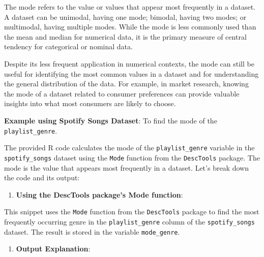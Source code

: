 \documentclass[
]{book}
\newenvironment{Shaded}{\begin{snugshade}}{\end{snugshade}}
\newcommand{\FunctionTok}[1]{\textcolor[rgb]{0.13,0.29,0.53}{\textbf{#1}}}
\newcommand{\NormalTok}[1]{#1}
\newcommand{\OtherTok}[1]{\textcolor[rgb]{0.56,0.35,0.01}{#1}}
\newcommand{\SpecialCharTok}[1]{\textcolor[rgb]{0.81,0.36,0.00}{\textbf{#1}}}
\providecommand{\tightlist}{%
  \setlength{\itemsep}{0pt}\setlength{\parskip}{0pt}}
\begin{document}
The mode refers to the value or values that appear most frequently in a dataset. A dataset can be unimodal, having one mode; bimodal, having two modes; or multimodal, having multiple modes. While the mode is less commonly used than the mean and median for numerical data, it is the primary measure of central tendency for categorical or nominal data.

Despite its less frequent application in numerical contexts, the mode can still be useful for identifying the most common values in a dataset and for understanding the general distribution of the data. For example, in market research, knowing the mode of a dataset related to consumer preferences can provide valuable insights into what most consumers are likely to choose.

\textbf{Example using Spotify Songs Dataset}: To find the mode of the \texttt{playlist\_genre}.

The provided R code calculates the mode of the \texttt{playlist\_genre} variable in the \texttt{spotify\_songs} dataset using the \texttt{Mode} function from the \texttt{DescTools} package. The mode is the value that appears most frequently in a dataset. Let's break down the code and its output:

\begin{enumerate}
\def\labelenumi{\arabic{enumi}.}
\tightlist
\item
  \textbf{Using the DescTools package's Mode function}:
\end{enumerate}

\begin{Shaded}
\end{Shaded}

This snippet uses the \texttt{Mode} function from the \texttt{DescTools} package to find the most frequently occurring genre in the \texttt{playlist\_genre} column of the \texttt{spotify\_songs} dataset. The result is stored in the variable \texttt{mode\_genre}.

\begin{enumerate}
\def\labelenumi{\arabic{enumi}.}
\setcounter{enumi}{1}
\tightlist
\item
  \textbf{Output Explanation}:
\end{enumerate}
\end{document}
